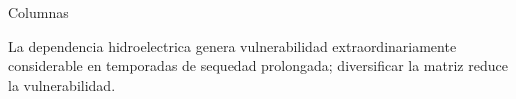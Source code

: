 \documentclass{beamer}
\begin{document}
\begin{frame}{Columnas}
\begin{minipage}{3.2cm}
La dependencia hidroelectrica genera vulnerabilidad extraordinariamente considerable en temporadas de sequedad prolongada; diversificar la matriz reduce la vulnerabilidad.
\end{minipage}
\end{frame}
\end{document}
